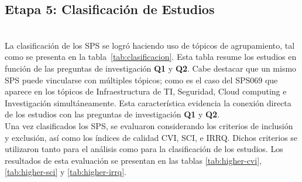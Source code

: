 \subsection{Etapa 5: Clasificación de Estudios}\label{sec:clasificacion-estudios}
\mbox{}\\
La clasificación de los SPS se logró haciendo uso de tópicos de agrupamiento, tal como se presenta en la tabla~\ref{tab:clasificacion}. Esta tabla resume los estudios en función de las preguntas de investigación \textbf{Q1} y \textbf{Q2}. Cabe destacar que un mismo SPS puede vincularse con múltiples tópicos; como es el caso del SPS069 que aparece en los tópicos de Infraestructura de TI, Seguridad, Cloud computing e Investigación simultáneamente. Esta característica evidencia la conexión directa de los estudios con las preguntas de investigación \textbf{Q1} y \textbf{Q2}.\\
Una vez clasificados los SPS, se evaluaron considerando los criterios de inclusión y exclusión, así como los índices de calidad CVI, SCI, e IRRQ. Dichos criterios se utilizaron tanto para el análisis como para la clasificación de los estudios. Los resultados de esta evaluación se presentan en las tablas \ref{tab:higher-cvi}, \ref{tab:higher-sci} y \ref{tab:higher-irrq}.


\onecolumn

